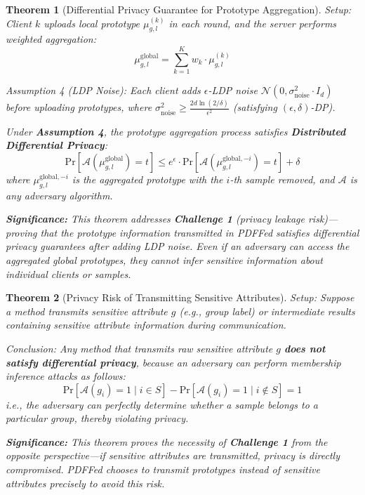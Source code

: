 \documentclass[11pt]{article}
\newtheorem{theorem}{Theorem}
\begin{document}
\begin{theorem}[Differential Privacy Guarantee for Prototype Aggregation]
\label{thm:privacy_prototype}
\textit{Setup}: Client $k$ uploads local prototype $\mu_{g,l}^{(k)}$ in each round, and the server performs weighted aggregation:
$$\mu_{g,l}^{\mathrm{global}} = \sum_{k=1}^K w_k \cdot \mu_{g,l}^{(k)}$$

\textit{Assumption 4 (LDP Noise)}: Each client adds $\epsilon$-LDP noise $\mathcal{N}(0, \sigma_{\mathrm{noise}}^2 \cdot I_d)$ before uploading prototypes, where $\sigma_{\mathrm{noise}}^2 \geq \frac{2d \ln(2/\delta)}{\epsilon^2}$ (satisfying $(\epsilon, \delta)$-DP).

Under \textbf{Assumption 4}, the prototype aggregation process satisfies \textbf{Distributed Differential Privacy}:
$$\mathrm{Pr}[\mathcal{A}(\mu_{g,l}^{\mathrm{global}}) = t] \leq e^\epsilon \cdot \mathrm{Pr}[\mathcal{A}(\mu_{g,l}^{\mathrm{global},-i}) = t] + \delta$$
where $\mu_{g,l}^{\mathrm{global},-i}$ is the aggregated prototype with the $i$-th sample removed, and $\mathcal{A}$ is any adversary algorithm.

\textbf{Significance:} This theorem addresses \textbf{Challenge 1} (privacy leakage risk)---proving that the prototype information transmitted in PDFFed satisfies differential privacy guarantees after adding LDP noise. Even if an adversary can access the aggregated global prototypes, they cannot infer sensitive information about individual clients or samples.
\end{theorem}

\begin{theorem}[Privacy Risk of Transmitting Sensitive Attributes]
\label{thm:privacy_risk}
\textit{Setup}: Suppose a method transmits sensitive attribute $g$ (e.g., group label) or intermediate results containing sensitive attribute information during communication.

\textit{Conclusion}: Any method that transmits raw sensitive attribute $g$ \textbf{does not satisfy differential privacy}, because an adversary can perform membership inference attacks as follows:
$$\mathrm{Pr}[\mathcal{A}(g_i) = 1 \mid i \in S] - \mathrm{Pr}[\mathcal{A}(g_i) = 1 \mid i \notin S] = 1$$
i.e., the adversary can perfectly determine whether a sample belongs to a particular group, thereby violating privacy.

\textbf{Significance:} This theorem proves the necessity of \textbf{Challenge 1} from the opposite perspective---if sensitive attributes are transmitted, privacy is directly compromised. PDFFed chooses to transmit prototypes instead of sensitive attributes precisely to avoid this risk.
\end{theorem}
\end{document}
